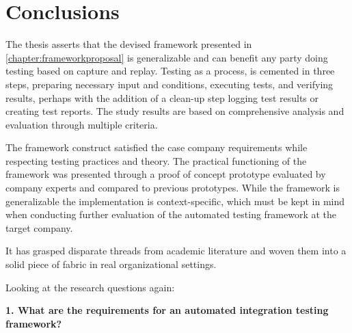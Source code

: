 \documentclass[12pt,a4paper,oneside,pdftex]{report}
\begin{document}
{\begin{comment}
Future research:
capture playback popular still despite warnings, what's up? when is it not applicable?
relationship between automation and manual work, test automation manual maintenance
integration test strategy in the vein if rehmann, what options/technical strategies are there? tired old big-bang
Strategies for test case creation (zeng & tan 2013)
study merits of fault based testing for more efficient tests
distinction between a technological configuration and process model is difficult.

notion of unit to system antiquated, block to block also
more an issue of test case construction and traceability
end-to-end tests are adequate if they can point to problem code accurately
\end{comment}

\chapter{Conclusions}
\label{chapter:conclusions}
The thesis asserts that the devised framework presented in \ref{chapter:frameworkproposal} is generalizable and can benefit any party doing testing based on capture and replay. Testing as a process, is cemented in three steps, preparing necessary input and conditions, executing tests, and verifying results, perhaps with the addition of a clean-up step logging test results or creating test reports. The study results are based on comprehensive analysis and evaluation through multiple criteria.

The framework construct satisfied the case company requirements while respecting testing practices and theory. The practical functioning of the framework was presented through a proof of concept prototype evaluated by company experts and compared to previous prototypes. While the framework is generalizable the implementation is context-specific, which must be kept in mind when conducting further evaluation of the automated testing framework at the target company.

It has grasped disparate threads from academic literature and woven them into a solid piece of fabric in real organizational settings. %

Looking at the research questions again: \\

\begin{adjustwidth}{2.5em}{0pt}
\textbf{1. What are the requirements for an automated integration testing framework?} \\
\end{adjustwidth}

}
\end{document}
